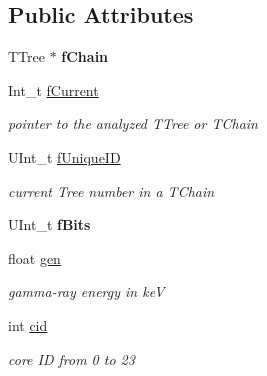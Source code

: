 \subsection*{Public Attributes}
\begin{DoxyCompactItemize}
\item 
\mbox{\label{classg__clx_aa0c1129a726bb6a3bda4197decf634f2}} 
T\+Tree $\ast$ {\bfseries f\+Chain}
\item 
\mbox{\label{classg__clx_a4ebe765901e5abf5d740a59edd2796d3}} 
Int\+\_\+t \hyperlink{classg__clx_a4ebe765901e5abf5d740a59edd2796d3}{f\+Current}
\begin{DoxyCompactList}\small\item\em pointer to the analyzed T\+Tree or T\+Chain \end{DoxyCompactList}\item 
\mbox{\label{classg__clx_abf3f260c2d2f9884a9f6b041f54ec94a}} 
U\+Int\+\_\+t \hyperlink{classg__clx_abf3f260c2d2f9884a9f6b041f54ec94a}{f\+Unique\+ID}
\begin{DoxyCompactList}\small\item\em current Tree number in a T\+Chain \end{DoxyCompactList}\item 
\mbox{\label{classg__clx_a7206bd09efca58552eea94544746280e}} 
U\+Int\+\_\+t {\bfseries f\+Bits}
\item 
\mbox{\label{classg__clx_afa1d8a83322f5f91c433b1747ffdc71b}} 
float \hyperlink{classg__clx_afa1d8a83322f5f91c433b1747ffdc71b}{gen}
\begin{DoxyCompactList}\small\item\em gamma-\/ray energy in keV \end{DoxyCompactList}\item 
\mbox{\label{classg__clx_a0cc2a584a4f5152751778ee68bcdb743}} 
int \hyperlink{classg__clx_a0cc2a584a4f5152751778ee68bcdb743}{cid}
\begin{DoxyCompactList}\small\item\em core ID from 0 to 23 \end{DoxyCompactList}\item 
\mbox{\label{classg__clx_a04f33012ec56804fca6978885732bc8f}} 

\end{DoxyCompactItemize}
